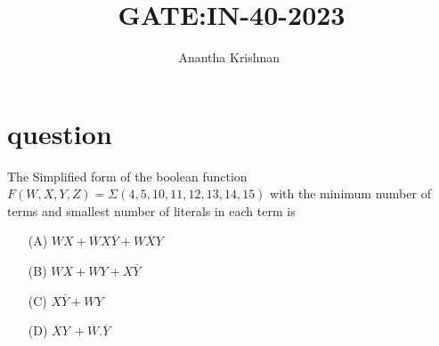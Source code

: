 \documentclass[journal,12pt,onecolumn]{IEEEtran}
\theoremstyle{remark}
\begin{document}

\vspace{3cm}

\title{GATE:IN-40-2023}
\author{Anantha Krishnan $^{}$%
}
\maketitle
\bigskip



\section{question}
The Simplified form of the boolean function $F(W,X,Y,Z)=\Sigma (4,5,10,11,12,13,14,15)$ with the minimum number of terms and smallest number of literals in each term is
\begin{enumerate}
    \item [(A)] $WX + \overline{W}X\overline{Y} + W\overline{X}Y$ 
    \item [(B)] $WX + WY + X\overline{Y}$ 
    \item [(C)] $X\overline{Y} + WY$ 
    \item [(D)] $\overline{X}Y\ + \overline{W}.\overline{Y}$ 
\end{enumerate}
 
\end{document}
